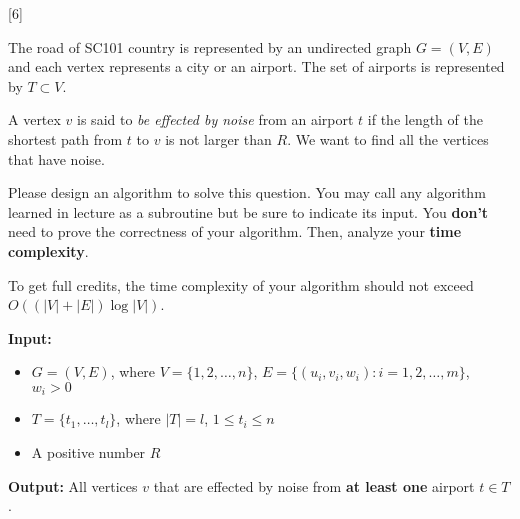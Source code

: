 [6]

The road of SC101 country is represented by an undirected graph $G = (V, E)$ and each vertex represents a city or an airport. The set of airports is represented by $T \subset V$.

A vertex $v$ is said to \textit{be effected by noise} from an airport $t$ if the length of the shortest path from $t$ to $v$ is not larger than $R$. We want to find all the vertices that have noise.

Please design an algorithm to solve this question. You may call any algorithm learned in lecture as a subroutine but be sure to indicate its input. You \textbf{don't} need to prove the correctness of your algorithm. Then, analyze your \textbf{time complexity}.

To get full credits, the time complexity of your algorithm should not exceed $O\left(\left(|V| + |E|\right) \log |V|\right)$.

\textbf{Input:}
\begin{itemize}
    \item $G = (V, E)$, where $V=\{1,2,\ldots, n\}$, $E=\{(u_i,v_i,w_i):i=1,2,\ldots, m\}$, $w_i > 0$
    \item $T = \{t_1, \ldots, t_{l}\}$, where $|T| = l$, $1 \le t_i \le n$
    \item A positive number $R$
\end{itemize}

\textbf{Output:} All vertices $v$ that are effected by noise from \textbf{at least one} airport $t \in T$.



